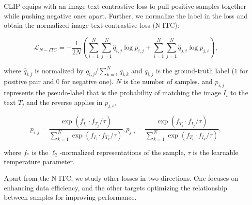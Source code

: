 \documentclass[letterpaper]{article} %
\begin{document}
CLIP equips with an image-text contrastive loss to pull positive samples together
while pushing negative ones apart.
Further, we normalize the label in the loss and obtain the normalized image-text contrastive loss (N-ITC):
\begin{small}
\begin{equation}
    \mathcal{L}_{N-ITC} = -\frac{1}{2N}( \sum_{i=1}^{N}\sum_{j=1}^{N} \hat{q}_{i,j} \log{p_{i,j}} + \sum_{i=1}^{N}\sum_{j=1}^{N} \hat{q}_{j,i} \log{p_{j,i}}),
    \label{eq:itc}
\end{equation}
\end{small}
where $\hat{q}_{i,j}$ is normalized by ${q_{i,j}}/{\sum_{k=1}^{N} q_{i,k}}$ and $q_{i,j}$ is the ground-truth label ($1$ for positive pair and $0$ for negative one).
$N$ is the number of samples, and 
$p_{i,j}$ represents the pseudo-label that is the probability of matching the image $I_i$ to the text $T_j$ and the reverse applies in $p_{j,i}$,
\begin{small}
\begin{equation}
    p_{i,j} = \frac {\exp( f_{I_{i}} \cdot f_{T_{j}} /\tau)}
        {\sum_{k=1}^{N} \exp( f_{I_{i}} \cdot f_{T_{k}} /\tau)}, 
    p_{j,i} = \frac {\exp( f_{T_{i}} \cdot f_{I_{j}} /\tau)}
        {\sum_{k=1}^{N} \exp( f_{T_{i}} \cdot f_{I_{k}} /\tau)},
\end{equation}
\end{small}
where $f_*$ is the $\ell_2$-normalized representations of the sample, $\tau$ is the learnable temperature parameter.

Apart from the N-ITC, we study other losses in two directions.
One focuses on enhancing data efficiency,
and the other targets optimizing the relationship between samples for improving performance.

\end{document}
